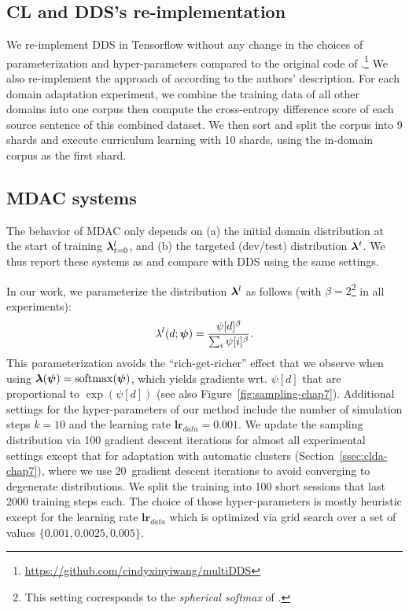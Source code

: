 \subsection{CL and DDS's re-implementation}
We re-implement DDS in Tensorflow without any change in the choices of parameterization and hyper-parameters compared to the original code of \citet{Wang20balancing}.\footnote{\url{https://github.com/cindyxinyiwang/multiDDS}}
% 
We also re-implement the approach of \citet{Zhang19curriculum} according to the authors' description. For each domain adaptation experiment, we combine the training data of all other domains into one corpus then compute the cross-entropy difference score of each source sentence of this combined dataset. We then sort and split the corpus into 9 shards and execute curriculum learning with 10 shards, using the in-domain corpus as the first shard.

\subsection{MDAC systems} \label{ssec:dds-sys-chap7}
The behavior of MDAC only depends on (a) the initial domain distribution at the start of training $\bm{\lambda}^{l}_{t=0}$, and (b) the targeted (dev/test) distribution $\bm{\lambda}^{t}$. We thus report these systems as  and compare with DDS using the same settings.

In our work, we parameterize the distribution $\bm{\lambda}^l$ as follows (with $\beta=2$\footnote{This setting corresponds to the \emph{spherical softmax} of \cite{Brebisson16anexploration}.} in all experiments):
\begin{equation}
\lambda^l(d;\bm{\psi}) = \frac{\psi[d]^\beta}{\sum_i \psi[i]^\beta}. \nonumber
\end{equation}
This parameterization avoids the ``rich-get-richer'' effect that we observe when using $\bm{\lambda}(\bm{\psi}) = \operatorname{softmax}(\bm{\psi})$, which yields gradients wrt. $\psi[d]$ that are proportional to $\exp(\psi[d])$ (see also Figure~\ref{fig:sampling-chap7}). Additional settings for the hyper-parameters of our method include the number of simulation steps $k=10$ and the learning rate $\mathbf{lr}_{data}=0.001$. We update the sampling distribution via 100 gradient descent iterations for almost all experimental settings except that for adaptation with automatic clusters (Section~\ref{ssec:clda-chap7}), where we use 20~gradient descent iterations to avoid converging to degenerate distributions. We split the training into 100 short sessions that last 2000 training steps each. The choice of those hyper-parameters is mostly heuristic except for the learning rate $\mathbf{lr}_{data}$ which is optimized via grid search over a set of values $\{0.001,0.0025,0.005\}$.

